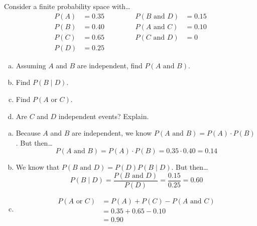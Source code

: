 \documentclass[12pt,letterpaper]{exam}
\begin{document}
\examtitle
{} 
\scores
\bottomline
\newpage

\begin{questions}

\newpage
\question[10] Consider a finite probability space with\dots
	\[
	\begin{aligned}
	P(A)&= 0.35   \qquad& 	&& P(B \text{ and } D)&= 0.15 \\
	P(B)&= 0.40 		& 	&& P(A \text{ and } C)&= 0.10 \\
	P(C)&= 0.65 		& 	&& P(C \text{ and } D)&= 0 \\
	P(D)&= 0.25
	\end{aligned}
	\]

\begin{enumerate}[(a)]
\item Assuming $A$ and $B$ are independent, find $P(A \text{ and } B)$. 
\item Find $P(B \;|\; D)$.
\item Find $P(A \text{ or } C)$.
\item Are $C$ and $D$ independent events? Explain. 
\end{enumerate} \pspace

\sol 
\begin{enumerate}[(a)]
\item Because $A$ and $B$ are independent, we know $P(A \text{ and } B)= P(A) \cdot P(B)$. But then\dots
	\[
	P(A \text{ and } B)= P(A) \cdot P(B)= 0.35 \cdot 0.40= 0.14
	\] \pspace

\item We know that $P(B \text{ and } D)= P(D) P(B \;|\; D)$. But then\dots
	\[
	P(B \;|\; D)= \dfrac{P(B \text{ and } D)}{P(D)}= \dfrac{0.15}{0.25}= 0.60
	\] \pspace

\item 
	\[
	\begin{aligned}
	P(A \text{ or } C)&= P(A) + P(C) - P(A \text{ and } C) \\[0.3cm]
	&= 0.35 + 0.65 - 0.10 \\[0.3cm]
	&= 0.90
	\end{aligned}
	\] \pspace


\end{enumerate}
\end{questions}
\end{document}
